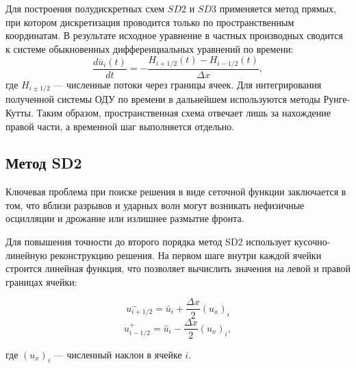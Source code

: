 \documentclass[12pt, a4paper]{article}
\theoremstyle{gostdef}
\begin{document}
	Для построения полудискретных схем $SD2$ и $SD3$ применяется метод прямых, при котором дискретизация проводится только по пространственным координатам. В результате исходное уравнение в частных производных сводится к системе обыкновенных дифференциальных уравнений по времени:
	\[
		\frac{d\bar{u}_{i}(t)}{dt} = - \frac{H_{i + 1/2}(t) - H_{i - 1/2}(t)}{\Delta x}, 
	\]
	где $H_{i \pm 1/2}$ --- численные потоки через границы ячеек.  Для интегрирования полученной системы ОДУ по времени в дальнейшем используются методы Рунге-Кутты. Таким образом, пространственная схема отвечает лишь за нахождение правой части, а временной шаг выполняется отдельно.
	
	\subsection{Метод SD2}
	
	Ключевая проблема при поиске решения в виде сеточной функции заключается в том, что вблизи разрывов и ударных волн могут возникать нефизичные осцилляции и дрожание или излишнее размытие фронта.
	

	Для повышения точности до второго порядка метод SD2 использует кусочно-линейную реконструкцию решения. На первом шаге внутри каждой ячейки строится линейная функция, что позволяет вычислить значения на левой и правой границах ячейки:
	
	\[
		u^{-}_{i + 1/2} = \bar{u}_{i} + \frac{\Delta x}{2}(u_x)_i
	\]
	\[
		u^{+}_{i - 1/2} = \bar{u}_{i} - \frac{\Delta x}{2}(u_x)_i,
	\]
	
	где $(u_x)_i$ --- численный наклон в ячейке $i$.
	
\end{document}
